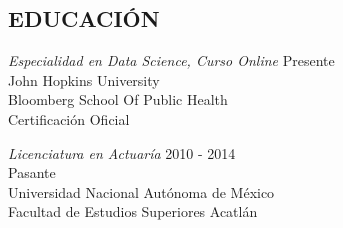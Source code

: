 \documentclass[margin]{res}
\begin{document}
\begin{resume}

\section{EDUCACIÓN}

{\sl Especialidad en Data Science, Curso Online} \hfill Presente\\
John Hopkins University\\
Bloomberg School Of Public Health\\
Certificación Oficial

{\sl Licenciatura en Actuaría} \hfill 2010 - 2014 \\
Pasante\\
Universidad Nacional Autónoma de México\\
Facultad de Estudios Superiores Acatlán







\end{resume}
\end{document}
